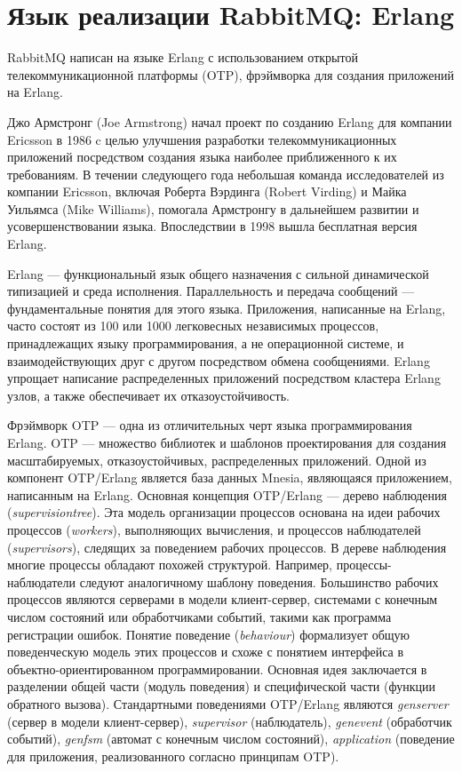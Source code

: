 \section{Язык реализации RabbitMQ: Erlang}
RabbitMQ написан на языке Erlang с использованием  открытой телекоммуникационной платформы (OTP),
фрэймворка для создания приложений на Erlang.

Джо Армстронг (Joe Armstrong) начал проект по созданию Erlang для компании Ericsson в 1986 c целью улучшения разработки телекоммуникационных приложений посредством создания языка наиболее приближенного к их требованиям. В течении следующего года небольшая команда исследователей из компании Ericsson, включая Роберта Вэрдинга (Robert Virding) и Майка Уильямса (Mike Williams), помогала Армстронгу в дальнейшем развитии и усовершенствовании языка. Впоследствии в 1998 вышла бесплатная версия Erlang.

Erlang --- функциональный язык общего назначения с сильной динамической типизацией и среда исполнения. Параллельность и передача сообщений --- фундаментальные понятия для этого языка. Приложения, написанные на Erlang, часто состоят из 100 или 1000 легковесных независимых процессов, принадлежащих языку программирования, а не операционной системе, и взаимодействующих друг с другом посредством обмена сообщениями. Erlang упрощает написание распределенных приложений посредством кластера Erlang узлов, а также обеспечивает их отказоустойчивость.

Фрэймворк OTP --- одна из отличительных черт языка программирования Erlang. OTP --- множество библиотек и шаблонов проектирования для создания масштабируемых, отказоустойчивых, распределенных приложений. Одной из компонент OTP/Erlang является база данных Mnesia, являющаяся приложением, написанным на Erlang. Основная концепция OTP/Erlang --- дерево наблюдения (\textit{supervision\thinspace tree}). Эта  модель организации процессов основана на идеи рабочих процессов (\textit{workers}), выполняющих вычисления, и процессов наблюдателей (\textit{supervisors}), следящих за поведением рабочих процессов. В дереве наблюдения многие процессы обладают похожей структурой. Например, процессы-наблюдатели следуют аналогичному шаблону поведения. Большинство рабочих процессов являются серверами в модели клиент-сервер, системами с конечным числом состояний  или обработчиками событий, такими как программа регистрации ошибок. Понятие поведение (\textit{behaviour}) формализует общую поведенческую модель этих процессов и схоже с понятием интерфейса в объектно-ориентированном программировании.  Основная идея заключается в разделении общей части (модуль поведения) и специфической части (функции обратного вызова). Стандартными поведениями OTP/Erlang являются \textit{gen\underline{\hspace{0.25cm}}server} (сервер в модели клиент-сервер), \textit{supervisor} (наблюдатель), \textit{gen\underline{\hspace{0.25cm}}event} (обработчик событий), \textit{gen\underline{\hspace{0.25cm}}fsm} (автомат с конечным числом состояний), \textit{application} (поведение для приложения, реализованного согласно принципам OTP).

